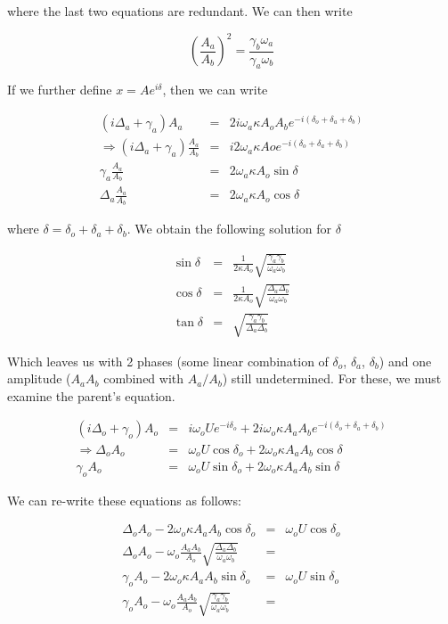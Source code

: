 where the last two equations are redundant. We can then write

\begin{equation}
\left(\frac{A_a}{A_b}\right)^2 = \frac{\gamma_b \omega_a}{\gamma_a \omega_b}
\end{equation}

If we further define $x=Ae^{i\delta}$, then we can write

\begin{eqnarray}
(i\Delta_a+\gamma_a)A_a & = & 2i\omega_a \kappa A_o A_b e^{-i(\delta_o+\delta_a+\delta_b)} \\
\Rightarrow (i\Delta_a+\gamma_a)\frac{A_a}{A_b} & = & i 2\omega_a \kappa Ao e^{-i(\delta_o+\delta_a+\delta_b)} \\
\gamma_a \frac{A_a}{A_b} & = & 2\omega_a\kappa A_o \sin\delta \\
\Delta_a \frac{A_a}{A_b} & = & 2\omega_a\kappa A_o \cos\delta
\end{eqnarray}

where $\delta = \delta_o+\delta_a+\delta_b$. We obtain the following solution for $\delta$

\begin{eqnarray}
\sin\delta & = & \frac{1}{2\kappa A_o}\sqrt{ \frac{\gamma_a\gamma_b}{\omega_a\omega_b} } \\
\cos\delta & = & \frac{1}{2\kappa A_o}\sqrt{ \frac{\Delta_a\Delta_b}{\omega_a\omega_b} } \\
\tan\delta & = & \sqrt{ \frac{\gamma_a\gamma_b}{\Delta_a\Delta_b}}
\end{eqnarray}


Which leaves us with 2 phases (some linear combination of $\delta_o$, $\delta_a$, $\delta_b$) and one amplitude ($A_aA_b$ combined with $A_a/A_b$) still undetermined. For these, we must examine the parent's equation.

\begin{eqnarray}
(i\Delta_o+\gamma_o)A_o & = & i\omega_o U e^{-i\delta_o} + 2i\omega_o\kappa A_aA_b e^{-i(\delta_o+\delta_a+\delta_b)} \\
\Rightarrow \Delta_o A_o & = & \omega_o U \cos\delta_o + 2\omega_o\kappa A_aA_b \cos\delta \\
\gamma_oA_o & = & \omega_o U \sin\delta_o + 2\omega_o\kappa A_aA_b \sin\delta
\end{eqnarray}

We can re-write these equations as follows:

\begin{eqnarray}
\Delta_oA_o - 2 \omega_o \kappa A_aA_b\cos\delta_o & = & \omega_o U \cos\delta_o \\
\Delta_oA_o - \omega_o \frac{A_aA_b}{A_o}\sqrt{\frac{\Delta_a\Delta_b}{\omega_a\omega_b} }& = & \\
\gamma_oA_o - 2 \omega_o \kappa A_aA_b\sin\delta_o & = & \omega_o U \sin\delta_o \\
\gamma_oA_o - \omega_o \frac{A_aA_b}{A_o}\sqrt{ \frac{\gamma_a\gamma_b}{\omega_a\omega_b} } & = & \\
\end{eqnarray}

